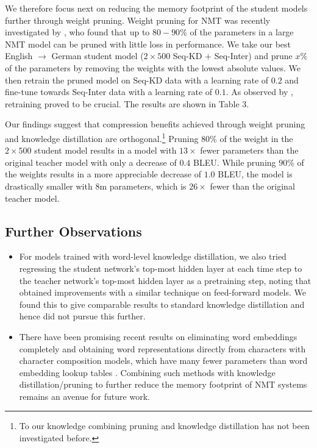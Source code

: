 \documentclass[11pt,letterpaper]{article}
\begin{document}
We therefore focus next on reducing the memory footprint of the student models further through 
weight pruning. Weight pruning for NMT was recently investigated by , who found that up to 
$80-90\%$ of the parameters in a large NMT model can be pruned with little loss in performance.
We take our best 
English $\rightarrow$ German student model ($2 \times 500$ Seq-KD $+$ Seq-Inter) and prune $x\%$ of the parameters by removing
the weights with the lowest absolute values.
We then retrain the pruned model on Seq-KD data with a learning rate of $0.2$ 
and fine-tune towards Seq-Inter data with a learning rate of $0.1$. As observed by ,
retraining proved to be crucial. The results are shown in Table 3. 

Our findings suggest that compression benefits achieved through 
weight pruning and knowledge distillation are 
orthogonal.\footnote{To our knowledge combining pruning and knowledge distillation has not been investigated before.}
 Pruning $80\%$
 of the weight in the $2 \times 500$ student model results in a model with $13\times$ fewer parameters than the original teacher 
model with only a decrease of $0.4$ BLEU.
 While pruning $90\%$ of the weights results in a more appreciable decrease of $1.0$ BLEU, 
the model is drastically smaller with $8$m parameters, which is $26\times$ fewer than the original teacher model.


\subsection{Further Observations}
\begin{itemize}
\item For models trained with word-level knowledge distillation, we also tried regressing the student network's
top-most hidden layer at each time step to the teacher network's top-most hidden layer as
a pretraining step, noting that  obtained improvements with a 
similar technique on feed-forward models.
We found this to give comparable results to standard knowledge distillation and 
hence did not pursue this further.
\item There have been promising recent results
on eliminating word embeddings completely
and obtaining word representations directly from characters 
with character composition models, which have many fewer parameters than word embedding
lookup tables
\cite{Ling2015,Kim2016,Ling2015b,Jozefowicz2016,Jussa2016}. 
Combining such methods with knowledge distillation/pruning 
to further reduce the memory footprint of
NMT systems remains an avenue for future work.
\end{itemize}
\end{document}
